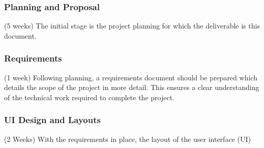 \subsubsection{Planning and Proposal}
(5 weeks)
The initial stage is the project planning for which the deliverable is this document.

\subsubsection{Requirements}
(1 week)
Following planning, a requirements document should be prepared which details the scope of the project in more detail. This ensures a clear understanding of the technical work required to complete the project.

\subsubsection{UI Design and Layouts}
(2 Weeks)
With the requirements in place, the layout of the user interface (UI)

